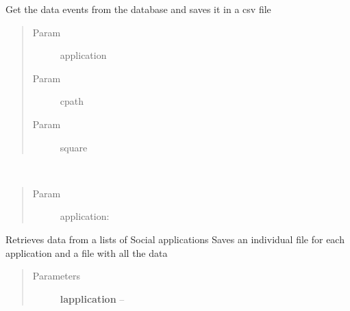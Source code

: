 \documentclass[letterpaper,10pt,english]{sphinxmanual}
\begin{document}
\begin{fulllineitems}
\label{index:SuperHub.DB.getApplicationData}
Get the data events from the database and saves it in a csv file
\begin{quote}\begin{description}
\item[{Param }] \leavevmode
application

\item[{Param }] \leavevmode
cpath

\item[{Param }] \leavevmode
square

\end{description}\end{quote}

\end{fulllineitems}


\begin{fulllineitems}
\label{index:SuperHub.DB.getApplicationData2}
\end{fulllineitems}


\begin{fulllineitems}
\label{index:SuperHub.DB.getApplicationDataOne}~\begin{quote}\begin{description}
\item[{Param }] \leavevmode
application:

\end{description}\end{quote}

\end{fulllineitems}


\begin{fulllineitems}
\label{index:SuperHub.DB.getLApplicationData}
Retrieves data from a lists of Social applications
Saves an individual file for each application
and a file with all the data
\begin{quote}\begin{description}
\item[{Parameters}] \leavevmode
\textbf{lapplication} -- 

\end{description}\end{quote}

\end{fulllineitems}
\end{document}
